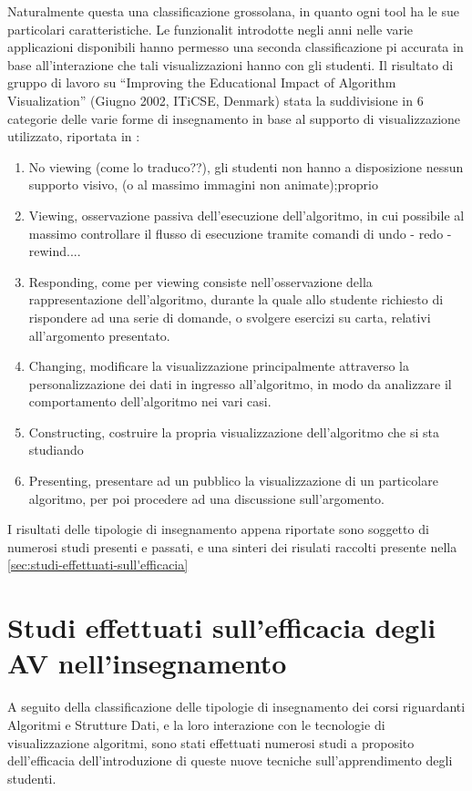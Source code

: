 Naturalmente questa una classificazione grossolana, in quanto ogni
tool ha le sue particolari caratteristiche. Le funzionalit introdotte
negli anni nelle varie applicazioni disponibili hanno permesso una
seconda classificazione pi accurata in base all'interazione che tali
visualizzazioni hanno con gli studenti. Il risultato di gruppo di
lavoro su {}``Improving the Educational Impact of Algorithm Visualization''
(Giugno 2002, ITiCSE, Denmark) stata la suddivisione in 6 categorie
delle varie forme di insegnamento in base al supporto di visualizzazione
utilizzato, riportata in \cite{AV-compare}: 
\begin{enumerate}
\item No viewing (come lo traduco??), gli studenti non hanno a disposizione
nessun supporto visivo, (o al massimo immagini non animate);proprio 
\item Viewing, osservazione passiva dell'esecuzione dell'algoritmo, in cui
possibile al massimo controllare il flusso di esecuzione tramite comandi
di undo - redo - rewind.... 
\item Responding, come per viewing consiste nell'osservazione della rappresentazione
dell'algoritmo, durante la quale allo studente richiesto di rispondere
ad una serie di domande, o svolgere esercizi su carta, relativi all'argomento
presentato. 
\item Changing, modificare la visualizzazione principalmente attraverso
la personalizzazione dei dati in ingresso all'algoritmo, in modo da
analizzare il comportamento dell'algoritmo nei vari casi. 
\item Constructing, costruire la propria visualizzazione dell'algoritmo
che si sta studiando 
\item Presenting, presentare ad un pubblico la visualizzazione di un particolare
algoritmo, per poi procedere ad una discussione sull'argomento. 
\end{enumerate}
I risultati delle tipologie di insegnamento appena riportate sono
soggetto di numerosi studi presenti e passati, e una sinteri dei risulati
raccolti presente nella \ref{sec:studi-effettuati-sull'efficacia}


\section{\label{sec:studi-effettuati-sull'efficacia}Studi effettuati sull'efficacia
degli AV nell'insegnamento}

A seguito della classificazione delle tipologie di insegnamento dei
corsi riguardanti Algoritmi e Strutture Dati, e la loro interazione
con le tecnologie di visualizzazione algoritmi, sono stati effettuati
numerosi studi a proposito dell'efficacia dell'introduzione di queste
nuove tecniche sull'apprendimento degli studenti.

